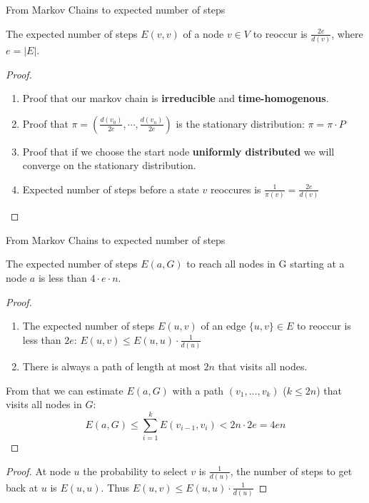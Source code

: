 \begin{frame}{From Markov Chains to expected number of steps}

\begin{theorem}
The expected number of steps $E(v, v)$ of a node $v \in V$ to reoccur is $\frac{2e}{d(v)}$,
where $e = |E|$.
\end{theorem}

\begin{proof}
\begin{enumerate}
\item Proof that our markov chain is \textbf{irreducible} and \textbf{time-homogenous}.
\item Proof that $\pi = (\frac{d(v_0)}{2e}, \cdots, \frac{d(v_n)}{2e})$ is the stationary distribution: $\pi = \pi \cdot P$
\item Proof that if we choose the start node \textbf{uniformly distributed} we will converge on the stationary distribution.
\item Expected number of steps before a state $v$ reoccures is $\frac{1}{\pi(v)} = \frac{2e}{d(v)}$
\end{enumerate}
\end{proof}

\end{frame}

\begin{frame}{From Markov Chains to expected number of steps}

\begin{theorem}
The expected number of steps $E(a, G)$ to reach all nodes in G starting at a node $a$ is less than $4 \cdot e \cdot n$.
\end{theorem}

\begin{proof}
\begin{enumerate}
\item The expected number of steps $E(u, v)$ of an edge $\{u, v\} \in E$ to reoccur is less than $2e$:
      $E(u, v) \leq E(u, u) \cdot \frac{1}{d(u)}$
\item There is always a path of length at most $2n$ that visits all nodes.
\end{enumerate}
From that we can estimate $E(a, G)$ with a path $(v_1, \dots, v_k)$ ($k \leq 2n$) that visits all nodes in $G$:
$$
E(a, G) \leq \sum_{i=1}^{k} E(v_{i-1}, v_i) < 2n \cdot 2e = 4en
$$
\end{proof}

\begin{proof}
At node $u$ the probability to select $v$ is $\frac{1}{d(u)}$, the number of steps to get back at $u$ is $E(u, u)$.
Thus $E(u, v) \leq E(u, u) \cdot \frac{1}{d(u)}$
\end{proof}

\end{frame}

